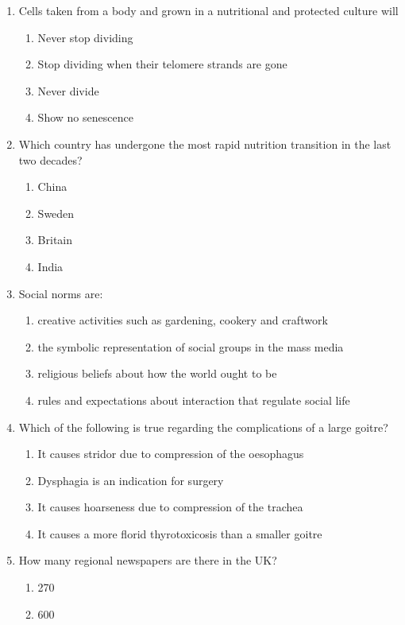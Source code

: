 \documentclass[12pt]{article}
\begin{document}
\begin{enumerate}[label=\arabic*.]
\item Cells taken from a body and grown in a nutritional and protected culture will
\begin{enumerate}[label=(\alph*)]
    \item Never stop dividing
    \item Stop dividing when their telomere strands are gone
    \item Never divide
    \item Show no senescence
\end{enumerate}
\item Which country has undergone the most rapid nutrition transition in the last two decades?
\begin{enumerate}[label=(\alph*)]
    \item China
    \item Sweden
    \item Britain
    \item India
\end{enumerate}
\item Social norms are:
\begin{enumerate}[label=(\alph*)]
    \item creative activities such as gardening, cookery and craftwork
    \item the symbolic representation of social groups in the mass media
    \item religious beliefs about how the world ought to be
    \item rules and expectations about interaction that regulate social life
\end{enumerate}
\item Which of the following is true regarding the complications of a large goitre?
\begin{enumerate}[label=(\alph*)]
    \item It causes stridor due to compression of the oesophagus
    \item Dysphagia is an indication for surgery
    \item It causes hoarseness due to compression of the trachea
    \item It causes a more florid thyrotoxicosis than a smaller goitre
\end{enumerate}
\item How many regional newspapers are there in the UK?
\begin{enumerate}[label=(\alph*)]
    \item 270
    \item 600

\end{enumerate}
\end{enumerate}
\end{document}

